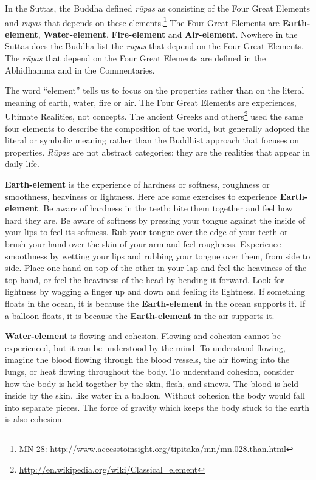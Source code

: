 In the Suttas, the Buddha defined \textit{rūpas} as consisting of the Four Great Elements and \textit{rūpas} that depends on these elements.\footnote{MN 28: \url{http://www.accesstoinsight.org/tipitaka/mn/mn.028.than.html}} The Four Great Elements are \textbf{Earth-element}, \textbf{Water-element}, \textbf{Fire-element} and \textbf{Air-element}. Nowhere in the Suttas does the Buddha list the \textit{rūpas} that depend on the Four Great Elements. The \textit{rūpas} that depend on the Four Great Elements are defined in the Abhidhamma and in the Commentaries.

The word “element” tells us to focus on the properties rather than on the literal meaning of earth, water, fire or air. The Four Great Elements are experiences, Ultimate Realities, not concepts. The ancient Greeks and others\footnote{\url{http://en.wikipedia.org/wiki/Classical_element}} used the same four elements to describe the composition of the world, but generally adopted the literal or symbolic meaning rather than the Buddhist approach that focuses on properties. \textit{Rūpas} are not abstract categories; they are the realities that appear in daily life.

\textbf{Earth-element} is the experience of hardness or softness, roughness or smoothness, heaviness or lightness. Here are some exercises to experience \textbf{Earth-element}. Be aware of hardness in the teeth; bite them together and feel how hard they are. Be aware of softness by pressing your tongue against the inside of your lips to feel its softness. Rub your tongue over the edge of your teeth or brush your hand over the skin of your arm and feel roughness. Experience smoothness by wetting your lips and rubbing your tongue over them, from side to side. Place one hand on top of the other in your lap and feel the heaviness of the top hand, or feel the heaviness of the head by bending it forward. Look for lightness by wagging a finger up and down and feeling its lightness. If something floats in the ocean, it is because the \textbf{Earth-element} in the ocean supports it. If a balloon floats, it is because the \textbf{Earth-element} in the air supports it.

\textbf{Water-element} is flowing and cohesion. Flowing and cohesion cannot be experienced, but it can be understood by the mind. To understand flowing, imagine the blood flowing through the blood vessels, the air flowing into the lungs, or heat flowing throughout the body. To understand cohesion, consider how the body is held together by the skin, flesh, and sinews. The blood is held inside by the skin, like water in a balloon. Without cohesion the body would fall into separate pieces. The force of gravity which keeps the body stuck to the earth is also cohesion.

